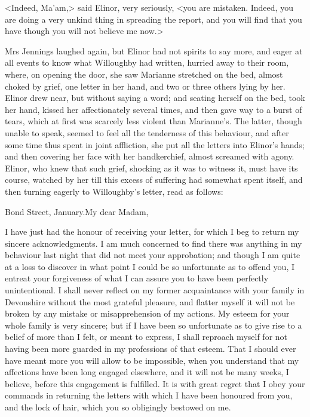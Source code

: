 <Indeed, Ma'am,> said Elinor, very seriously, <you are mistaken. Indeed, you are doing a very unkind thing in spreading the report, and you will find that you have though you will not believe me now.>

Mrs Jennings laughed again, but Elinor had not spirits to say more, and eager at all events to know what Willoughby had written, hurried away to their room, where, on opening the door, she saw Marianne stretched on the bed, almost choked by grief, one letter in her hand, and two or three others lying by her. Elinor drew near, but without saying a word; and seating herself on the bed, took her hand, kissed her affectionately several times, and then gave way to a burst of tears, which at first was scarcely less violent than Marianne's. The latter, though unable to speak, seemed to feel all the tenderness of this behaviour, and after some time thus spent in joint affliction, she put all the letters into Elinor's hands; and then covering her face with her handkerchief, almost screamed with agony. Elinor, who knew that such grief, shocking as it was to witness it, must have its course, watched by her till this excess of suffering had somewhat spent itself, and then turning eagerly to Willoughby's letter, read as follows:

\begin{mail}{Bond Street, January.}{My dear Madam,}

I have just had the honour of receiving your letter, for which I beg to return my sincere acknowledgments. I am much concerned to find there was anything in my behaviour last night that did not meet your approbation; and though I am quite at a loss to discover in what point I could be so unfortunate as to offend you, I entreat your forgiveness of what I can assure you to have been perfectly unintentional. I shall never reflect on my former acquaintance with your family in Devonshire without the most grateful pleasure, and flatter myself it will not be broken by any mistake or misapprehension of my actions. My esteem for your whole family is very sincere; but if I have been so unfortunate as to give rise to a belief of more than I felt, or meant to express, I shall reproach myself for not having been more guarded in my professions of that esteem. That I should ever have meant more you will allow to be impossible, when you understand that my affections have been long engaged elsewhere, and it will not be many weeks, I believe, before this engagement is fulfilled. It is with great regret that I obey your commands in returning the letters with which I have been honoured from you, and the lock of hair, which you so obligingly bestowed on me.

\end{mail}


